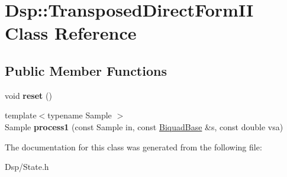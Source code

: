 \hypertarget{classDsp_1_1TransposedDirectFormII}{\section{Dsp\-:\-:Transposed\-Direct\-Form\-I\-I Class Reference}
\label{classDsp_1_1TransposedDirectFormII}
}
\subsection*{Public Member Functions}
\begin{DoxyCompactItemize}
\item 
\hypertarget{classDsp_1_1TransposedDirectFormII_a8278fd34fe383ae7c8668353ad72ef05}{void {\bfseries reset} ()}\label{classDsp_1_1TransposedDirectFormII_a8278fd34fe383ae7c8668353ad72ef05}

\item 
\hypertarget{classDsp_1_1TransposedDirectFormII_a962c2897b871c4ab0781dceb8263f45c}{{\footnotesize template$<$typename Sample $>$ }\\Sample {\bfseries process1} (const Sample in, const \hyperlink{classDsp_1_1BiquadBase}{Biquad\-Base} \&s, const double vsa)}\label{classDsp_1_1TransposedDirectFormII_a962c2897b871c4ab0781dceb8263f45c}

\end{DoxyCompactItemize}


The documentation for this class was generated from the following file\-:\begin{DoxyCompactItemize}
\item 
Dsp/State.\-h\end{DoxyCompactItemize}
